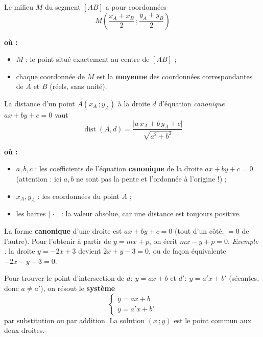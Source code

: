 \documentclass[11pt,a4paper]{article}
\newenvironment{ou}{%
  \par\smallskip\noindent\textbf{où :}\nopagebreak
  \begin{itemize}[leftmargin=1.8em,topsep=2pt,itemsep=1.5pt,parsep=0pt]}%
  {\end{itemize}}
\begin{document}
\begin{formule}
Le milieu $M$ du segment $[AB]$ a pour coordonnées
\[
  \boxed{\;M\left(\dfrac{x_A+x_B}{2}\,;\dfrac{y_A+y_B}{2}\right)\;}
\]
\begin{ou}
  \item $M$ : le point situé exactement au centre de $[AB]$ ;
  \item chaque coordonnée de $M$ est la \textbf{moyenne} des coordonnées correspondantes de $A$ et $B$ (réels, sans unité).
\end{ou}
\end{formule}

\begin{formule}
La distance d'un point $A(x_A\,;y_A)$ à la droite $d$ d'équation \emph{canonique}
$ax+by+c=0$ vaut
\[
  \boxed{\;\operatorname{dist}(A,d)=\dfrac{\lvert a\,x_A+b\,y_A+c\rvert}{\sqrt{a^2+b^2}}\;}
\]
\begin{ou}
  \item $a,b,c$ : les coefficients de l'équation \textbf{canonique} de la droite $ax+by+c=0$ (attention : ici $a,b$ ne sont pas la pente et l'ordonnée à l'origine !) ;
  \item $x_A,y_A$ : les coordonnées du point $A$ ;
  \item les barres $\lvert\,\cdot\,\rvert$ : la valeur absolue, car une distance est toujours positive.
\end{ou}
\end{formule}

\begin{attention}
La forme \textbf{canonique} d'une droite est $ax+by+c=0$ (tout d'un côté, $=0$ de l'autre).
Pour l'obtenir à partir de $y=mx+p$, on écrit $mx-y+p=0$. \emph{Exemple :} la droite
$y=-2x+3$ devient $2x+y-3=0$, ou de façon équivalente $-2x-y+3=0$.
\end{attention}

\begin{formule}
Pour trouver le point d'intersection de $d:\ y=ax+b$ et $d':\ y=a'x+b'$
(sécantes, donc $a\neq a'$), on résout le \textbf{système}
\[
  \boxed{\;\begin{cases} y=ax+b\\[2pt] y=a'x+b' \end{cases}\;}
\]
par substitution ou par addition. La solution $(x\,;y)$ est le point commun aux deux droites.
\end{formule}
\end{document}
